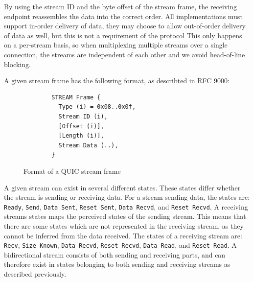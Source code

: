By using the stream ID and the byte offset of the stream frame,
the receiving endpoint reassembles the data into the correct
order. All implementations must support in-order delivery of
data, they may choose to allow out-of-order delivery of data as
well, but this is not a requirement of the protocol This only
happens on a per-stream basis, so when multiplexing multiple
streams over a single connection, the streams are independent of
each other and we avoid head-of-line blocking.

A given stream frame has the following format, as describted in
RFC 9000:

\begin{figure}[H]
	\centering
	\begin{lstlisting}
        STREAM Frame {
          Type (i) = 0x08..0x0f,
          Stream ID (i),
          [Offset (i)],
          [Length (i)],
          Stream Data (..),
        }
    \end{lstlisting}
	\caption{Format of a QUIC stream frame \cite{iyengarQUICUDPBasedMultiplexed2021}}
	\label{fig:stream_frame_format}
\end{figure}

A given stream can exist in several different states.
These states differ whether the stream is sending or receiving
data. For a stream sending data, the states are:
\texttt{Ready}, \texttt{Send}, \texttt{Data Sent}, \texttt{Reset Sent},
\texttt{Data Recvd}, and \texttt{Reset Recvd}.
A receiving streams states maps the perceived states of the
sending stream. This means that there are some states
which are not represented in the receiving stream, as they
cannot be inferred from the data received. The states of a
receiving stream are: 
\texttt{Recv}, \texttt{Size Known}, \texttt{Data Recvd}, \texttt{Reset Recvd},
\texttt{Data Read}, and \texttt{Reset Read}.
A bidirectional stream consists of both sending and receiving parts,
and can therefore exist in states belonging to both sending and
receiving streams as described previously.

